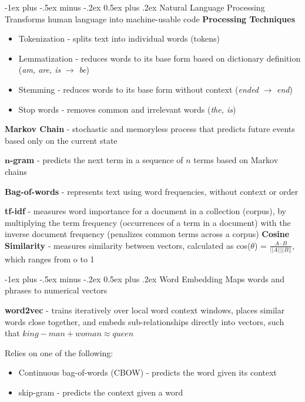 \documentclass[10pt,landscape]{article}
\makeatletter
\renewcommand{\section}{\@startsection{section}{1}{0mm}%
                                {-1ex plus -.5ex minus -.2ex}%
                                {0.5ex plus .2ex}%
                                {\normalfont\large\bfseries}}
\renewcommand{\subsection}{\@startsection{subsection}{2}{0mm}%
                                {-1ex plus -.5ex minus -.2ex}%
                                {0.5ex plus .2ex}%
                                {\normalfont\normalsize\bfseries}}
\makeatother
\begin{document}
\begin{multicols}{3}
\section{Natural Language Processing}
Transforms human language into machine-usable code
\textbf{Processing Techniques}
\begin{itemize}[label={--},leftmargin=4mm]
\itemsep -.4mm
\item Tokenization - splits text into individual words (tokens)
\item Lemmatization - reduces words to its base form based on dictionary definition (\emph{am, are, is} $\to$ \emph{be})
\item Stemming - reduces words to its base form without context (\emph{ended} $\to$ \emph{end})
\item Stop words - removes common and irrelevant words (\emph{the, is})
\end{itemize}

\textbf{Markov Chain} - stochastic and memoryless process that predicts future events based only on the current state

$\boldsymbol{n}$\textbf{-gram} - predicts the next term in a sequence of $n$ terms based on Markov chains

\textbf{Bag-of-words} - represents text using word frequencies, without context or order

\textbf{tf-idf} - measures word importance for a document in a collection (corpus), by multiplying the term frequency (occurrences of a term in a document) with the inverse document frequency (penalizes common terms across a corpus)
\textbf{Cosine Similarity} - measures similarity between vectors, calculated as cos($\theta$) =
$\frac{A\cdot B}{||A||||B||} $, which ranges from o to 1

\subsection{Word Embedding}
Maps words and phrases to numerical vectors

\textbf{word2vec} - trains iteratively over local  word context windows, places similar words close together, and embeds sub-relationships directly into vectors, such that $king - man + woman \approx queen$

Relies on one of the following:
\begin{itemize}[label={--},leftmargin=4mm]
\itemsep -.4mm
\item Continuous bag-of-words (CBOW) - predicts the word given its context
\item skip-gram - predicts the context given a word
\end{itemize}


\end{multicols}
\end{document}
